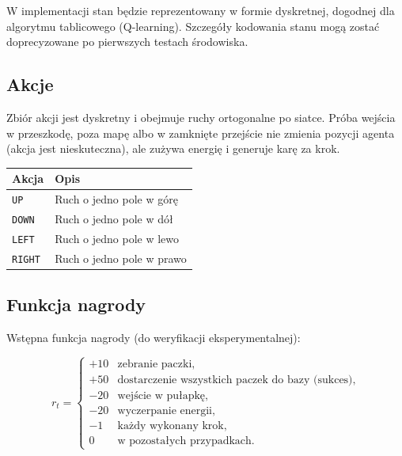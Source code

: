 \documentclass[12pt]{article}
\begin{document}
W implementacji stan będzie reprezentowany w formie dyskretnej, dogodnej dla algorytmu
tablicowego (Q-learning). Szczegóły kodowania stanu mogą zostać doprecyzowane po pierwszych testach środowiska.

\subsection{Akcje}

Zbiór akcji jest dyskretny i obejmuje ruchy ortogonalne po siatce.
Próba wejścia w przeszkodę, poza mapę albo w zamknięte przejście nie zmienia pozycji agenta
(akcja jest nieskuteczna), ale zużywa energię i generuje karę za krok.

\begin{center}
\begin{tabular}{p{}p{}}
\toprule
Akcja & Opis \\
\midrule
\texttt{UP} & Ruch o jedno pole w górę \\
\texttt{DOWN} & Ruch o jedno pole w dół \\
\texttt{LEFT} & Ruch o jedno pole w lewo \\
\texttt{RIGHT} & Ruch o jedno pole w prawo \\
\bottomrule
\end{tabular}
\end{center}

\subsection{Funkcja nagrody}

Wstępna funkcja nagrody (do weryfikacji eksperymentalnej):

\begin{equation}
    r_t =
    \begin{cases}
        +10 & \text{zebranie paczki}, \\
        +50 & \text{dostarczenie wszystkich paczek do bazy (sukces)}, \\
        -20 & \text{wejście w pułapkę}, \\
        -20 & \text{wyczerpanie energii}, \\
        -1 & \text{każdy wykonany krok}, \\
        0 & \text{w pozostałych przypadkach}.
    \end{cases}
\end{equation}
\end{document}
